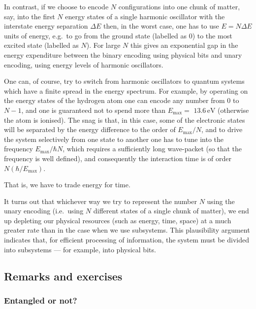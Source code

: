 \documentclass[fleqn]{article}
\begin{document}
In contrast, if we choose to encode \(N\) configurations into one chunk of matter, say, into the first \(N\) energy states of a single harmonic oscillator with the interstate energy separation \(\Delta E\) then, in the worst case, one has to use \(E=N\Delta E\) units of energy, e.g.~to go from the ground state (labelled as \(0\)) to the most excited state (labelled as \(N\)).
For large \(N\) this gives an exponential gap in the energy expenditure between the binary encoding using physical bits and unary encoding, using energy levels of harmonic oscillators.

One can, of course, try to switch from harmonic oscillators to quantum systems which have a finite spread in the energy spectrum.
For example, by operating on the energy states of the hydrogen atom one can encode any number from \(0\) to \(N-1\), and one is guaranteed not to spend more than \(E_{\mathrm{max}}=\) \(13.6\,\mathrm{eV}\) (otherwise the atom is ionised).
The snag is that, in this case, some of the electronic states will be separated by the energy difference to the order of \(E_{\mathrm{max}}/N\), and to drive the system selectively from one state to another one has to tune into the frequency \(E_{\mathrm{max}}/\hbar N\), which requires a sufficiently long wave-packet (so that the frequency is well defined), and consequently the
interaction time is of order \(N(\hbar/E_{\mathrm{max}})\).

That is, we have to trade energy for time.

It turns out that whichever way we try to represent the number \(N\) using the unary encoding (i.e.~using \(N\) different states of a single chunk of matter), we end up depleting our physical resources (such as energy, time, space) at a much greater rate than in the case when we use subsystems.
This plausibility argument indicates that, for efficient processing of information, the system must be divided into subsystems --- for example, into physical bits.

\hypertarget{remarks-and-exercises-1}{%
\subsection{Remarks and exercises}\label{remarks-and-exercises-1}}

\hypertarget{entangled-or-not}{%
\subsubsection{Entangled or not?}\label{entangled-or-not}}
\end{document}
